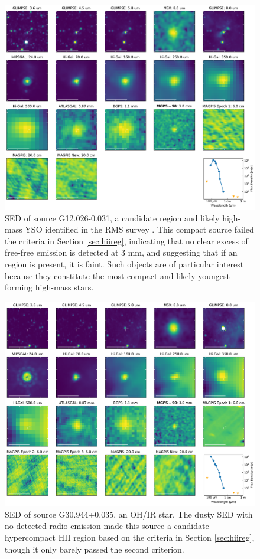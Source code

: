 \documentclass[twocolumn]{aastex62}
\begin{document}
\begin{figure}[htp]
\includegraphics[width=17cm]{figures/SED_plot_G12_G12.026-0.031.pdf}
\caption{SED of source G12.026-0.031, a candidate \hchii region and likely high-mass YSO identified in the RMS
survey \citep{Lumsden2013a}.  This compact source failed the criteria in Section \ref{sec:hiireg},
indicating that no clear excess of free-free emission is detected at 3 mm, and suggesting that if an \hchii region is
present, it is faint.  Such objects are of particular interest because they constitute the most compact and likely youngest
forming high-mass stars.}
\label{fig:g12hiicand}
\end{figure}



\begin{figure}[htp]
\includegraphics[width=17cm]{figures/SED_plot_G31_G30.944+0.035.pdf}
\caption{SED of source G30.944+0.035, an OH/IR star.  The dusty SED with no
detected radio emission made this source a candidate hypercompact HII region
based on the criteria in Section \ref{sec:hiireg}, though it only barely passed
the second criterion.}
\label{fig:g31ohir}
\end{figure}
\end{document}
